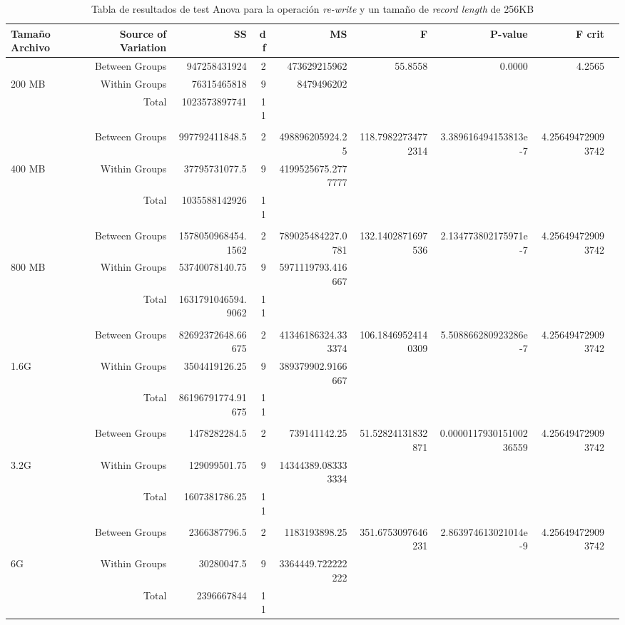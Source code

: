 \begin{landscape}
\begin{table}[!htp]\centering
\caption{Tabla de resultados de test Anova para la operación \textit{re-write} y un tamaño de \textit{record length} de 256KB}\label{tab: }
\scriptsize
\begin{tabular}{lrrrrrrrr}\toprule
Tamaño Archivo &Source of Variation &SS &df &MS &F &P-value &F crit \\\midrule
&Between Groups &947258431924 &2 &473629215962 &55.8558 &0.0000 &4.2565 \\
200 MB &Within Groups &76315465818 &9 &8479496202 & & & \\
&Total &1023573897741 &11 & & & & \\
& & & & & & & \\
&Between Groups &997792411848.5 &2 &498896205924.25 &118.79822734772314 &3.389616494153813e-7 &4.256494729093742 \\
400 MB &Within Groups &37795731077.5 &9 &4199525675.2777777 & & & \\
&Total &1035588142926 &11 & & & & \\
& & & & & & & \\
&Between Groups &1578050968454.1562 &2 &789025484227.0781 &132.1402871697536 &2.134773802175971e-7 &4.256494729093742 \\
800 MB &Within Groups &53740078140.75 &9 &5971119793.416667 & & & \\
&Total &1631791046594.9062 &11 & & & & \\
& & & & & & & \\
&Between Groups &82692372648.66675 &2 &41346186324.333374 &106.18469524140309 &5.508866280923286e-7 &4.256494729093742 \\
1.6G &Within Groups &3504419126.25 &9 &389379902.9166667 & & & \\
&Total &86196791774.91675 &11 & & & & \\
& & & & & & & \\
&Between Groups &1478282284.5 &2 &739141142.25 &51.52824131832871 &0.000011793015100236559 &4.256494729093742 \\
3.2G &Within Groups &129099501.75 &9 &14344389.083333334 & & & \\
&Total &1607381786.25 &11 & & & & \\
& & & & & & & \\
&Between Groups &2366387796.5 &2 &1183193898.25 &351.6753097646231 &2.863974613021014e-9 &4.256494729093742 \\
6G &Within Groups &30280047.5 &9 &3364449.722222222 & & & \\
&Total &2396667844 &11 & & & & \\
\bottomrule
\end{tabular}
\end{table}
\end{landscape}


